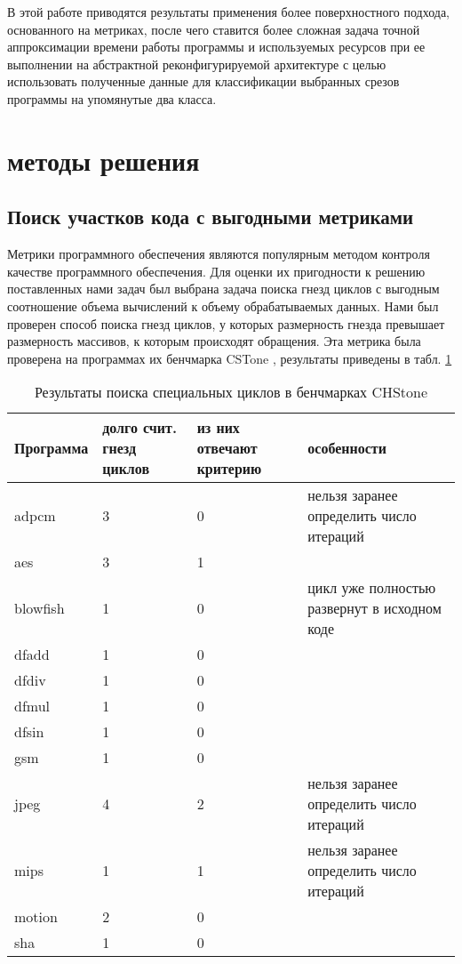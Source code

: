 \documentclass[utf8]{psta}%
\begin{document}
В этой работе приводятся результаты применения более поверхностного подхода, основанного на метриках, после чего ставится более сложная задача точной аппроксимации времени работы программы и используемых ресурсов при ее выполнении на абстрактной реконфигурируемой архитектуре с целью использовать полученные данные для классификации выбранных срезов программы на упомянутые два класса.

\section{методы решения}

\subsection{Поиск участков кода с выгодными метриками}

Метрики программного обеспечения являются популярным методом контроля качестве программного обеспечения. Для оценки их пригодности к решению поставленных нами задач был выбрана задача поиска гнезд циклов с выгодным соотношение объема вычислений к объему обрабатываемых данных.
Нами был проверен способ поиска гнезд циклов, у которых размерность гнезда превышает размерность массивов, к которым происходят обращения. Эта метрика была проверена на программах их бенчмарка CSTone \cite{Hara2009}, результаты приведены в табл. \ref{table:CHStoneSingularLoops}

\begin{table}
    \begin{tabular}{ | p{1.5cm} | p{2cm} | p{1cm} | p{6cm} |}
    \hline
    Программа & долго счит. гнезд циклов & из них отвечают критерию & особенности \\ \hline
    adpcm & 3 & 0 & нельзя заранее определить число итераций \\ \hline
    aes & 3 & 1 &  \\ \hline
    blowfish & 1 & 0 & цикл уже полностью развернут в исходном коде \\ \hline
    dfadd & 1 & 0 &  \\ \hline
    dfdiv & 1 & 0 &  \\ \hline
    dfmul & 1 & 0 &  \\ \hline
    dfsin & 1 & 0 &  \\ \hline
    gsm & 1 & 0 &  \\ \hline
    jpeg & 4 & 2 & нельзя заранее определить число итераций \\ \hline
    mips & 1 & 1 & нельзя заранее определить число итераций \\ \hline
    motion & 2 & 0 &  \\ \hline
    sha & 1 & 0 &  \\ \hline
    \end{tabular} 
    \caption{Результаты поиска специальных циклов в бенчмарках CHStone}
    \label{table:CHStoneSingularLoops}
\end{table}
\end{document}
